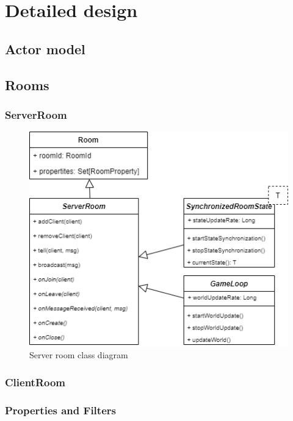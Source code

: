 \chapter{Detailed design}

\section{Actor model}

\section{Rooms}

\subsection{ServerRoom}
\begin{figure}[h]
	\centering
	\includegraphics[scale=0.6]{images/4-design/server-room.png}
	\caption{Server room class diagram}
	\label{fig:server_room_class_diagram}
\end{figure}

\subsection{ClientRoom}

\subsection{Properties and Filters}

